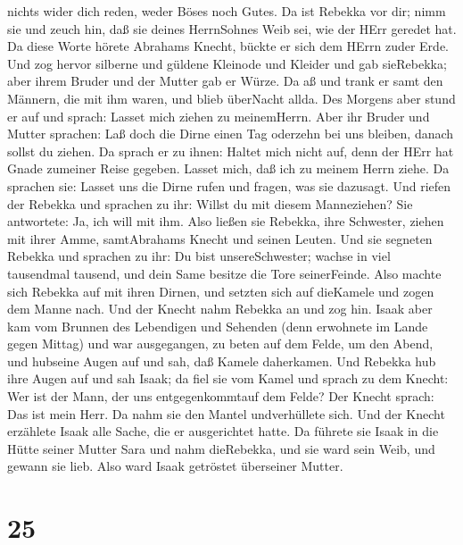 nichts wider dich reden, weder Böses noch Gutes.  Da ist
Rebekka vor dir; nimm sie und zeuch hin, daß sie deines HerrnSohnes Weib
sei, wie der HErr geredet hat.  Da diese Worte hörete
Abrahams Knecht, bückte er sich dem HErrn zuder Erde.  Und
zog hervor silberne und güldene Kleinode und Kleider und gab sieRebekka;
aber ihrem Bruder und der Mutter gab er Würze.  Da aß und
trank er samt den Männern, die mit ihm waren, und blieb überNacht allda.
Des Morgens aber stund er auf und sprach: Lasset mich ziehen zu
meinemHerrn.  Aber ihr Bruder und Mutter sprachen: Laß doch
die Dirne einen Tag oderzehn bei uns bleiben, danach sollst du ziehen.
 Da sprach er zu ihnen: Haltet mich nicht auf, denn der
HErr hat Gnade zumeiner Reise gegeben. Lasset mich, daß ich zu meinem
Herrn ziehe.  Da sprachen sie: Lasset uns die Dirne rufen
und fragen, was sie dazusagt.  Und riefen der Rebekka und
sprachen zu ihr: Willst du mit diesem Manneziehen? Sie antwortete: Ja,
ich will mit ihm.  Also ließen sie Rebekka, ihre Schwester,
ziehen mit ihrer Amme, samtAbrahams Knecht und seinen Leuten.
 Und sie segneten Rebekka und sprachen zu ihr: Du bist
unsereSchwester; wachse in viel tausendmal tausend, und dein Same
besitze die Tore seinerFeinde.  Also machte sich Rebekka
auf mit ihren Dirnen, und setzten sich auf dieKamele und zogen dem Manne
nach. Und der Knecht nahm Rebekka an und zog hin.  Isaak
aber kam vom Brunnen des Lebendigen und Sehenden (denn erwohnete im
Lande gegen Mittag)  und war ausgegangen, zu beten auf dem
Felde, um den Abend, und hubseine Augen auf und sah, daß Kamele
daherkamen.  Und Rebekka hub ihre Augen auf und sah Isaak;
da fiel sie vom Kamel  und sprach zu dem Knecht: Wer ist
der Mann, der uns entgegenkommtauf dem Felde? Der Knecht sprach: Das ist
mein Herr. Da nahm sie den Mantel undverhüllete sich.  Und
der Knecht erzählete Isaak alle Sache, die er ausgerichtet hatte.
 Da führete sie Isaak in die Hütte seiner Mutter Sara und
nahm dieRebekka, und sie ward sein Weib, und gewann sie lieb. Also ward
Isaak getröstet überseiner Mutter.

\hypertarget{section-24}{%
\section{25}\label{section-24}}

